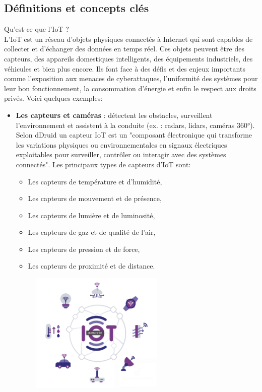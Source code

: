 \subsection{Définitions et concepts clés}
Qu'est-ce que l'IoT ?\\
L'IoT est un réseau d’objets physiques connectés à Internet qui sont capables de collecter et d’échanger des données en temps réel. Ces objets peuvent être des capteurs, des appareils domestiques intelligents, des équipements industriels, des véhicules et bien plus encore. Ils font face à des défis et des enjeux importants comme l'exposition aux menaces de cyberattaques, l'uniformité des systèmes pour leur bon fonctionnement, la consommation d'énergie et enfin le respect aux droits privés. Voici quelques exemples:
\begin{itemize}
    \item \textbf{Les capteurs et caméras} : détectent les obstacles, surveillent l’environnement et assistent à la conduite (ex. : radars, lidars, caméras 360°). Selon dDruid\cite{capteur} un capteur IoT est un "composant électronique qui transforme les variations physiques ou environnementales en signaux électriques exploitables pour surveiller, contrôler ou interagir avec des systèmes connectés".
    Les principaux types de capteurs d'IoT sont: 
    \begin{itemize}
        \label{capteurs}
        \item Les capteurs de température et d'humidité,
        \item Les capteurs de mouvement et de présence,
        \item Les capteurs de lumière et de luminosité,
        \item Les capteurs de gaz et de qualité de l’air,
        \item Les capteurs de pression et de force,
        \item Les capteurs de proximité et de distance.
    \end{itemize}
    \begin{figure}[H]
        \centering
        \includegraphics[width=0.6\textwidth]{images/capteur.png} 

\end{figure}
\end{itemize}
